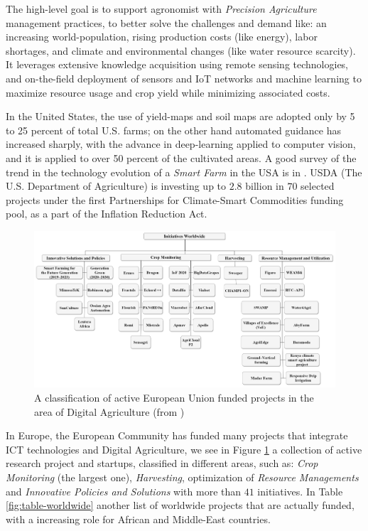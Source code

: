 \documentclass[comsoc,final]{IEEEtran}
\begin{document}
The high-level goal is to support agronomist with \emph{Precision Agriculture} management practices, to better solve the challenges and demand like: an increasing world-population, rising production costs (like energy), labor shortages, and climate and environmental changes (like water resource scarcity). It leverages extensive knowledge acquisition using remote sensing technologies, and on-the-field deployment of sensors and IoT networks \cite{LiSurvey2021}%
and machine learning \cite{seng2018computer} to maximize resource usage and crop yield while minimizing associated costs.

In the United States, the use of yield-maps and soil maps are adopted only by 5 to 25 percent of total U.S. farms; on the other hand automated guidance has increased sharply, with the advance in deep-learning applied to computer vision, and it is applied to over 50 percent of the cultivated areas. A good survey of the trend in the technology evolution of a \emph{Smart Farm} in the USA is in \cite{mcfadden2023precision}. USDA (The U.S. Department of Agriculture) is investing up to $2.8$ billion in $70$ selected projects under the first Partnerships for Climate-Smart Commodities funding pool, as a part of the Inflation Reduction Act.

\begin{figure}
    \centering
    \includegraphics[width=\columnwidth]{agriengineering-04-00029-g005}
    \caption{A classification of active European Union funded projects in the area of Digital Agriculture (from \cite{agriengineering4020029})}
    \label{fig:euprojects}
\end{figure}

In Europe, the European Community has funded many projects that integrate ICT technologies and Digital Agriculture, we see in Figure \ref{fig:euprojects} a collection of active research project and startups, classified in different areas, such as:  \emph{Crop Monitoring}  (the largest one), \emph{Harvesting}, optimization of \emph{Resource Managements} and \emph{Innovative Policies and Solutions} with more than $41$ initiatives. In Table \ref{fig:table-worldwide} another list of worldwide projects that are actually funded, with a increasing role for African and Middle-East countries.
\end{document}
